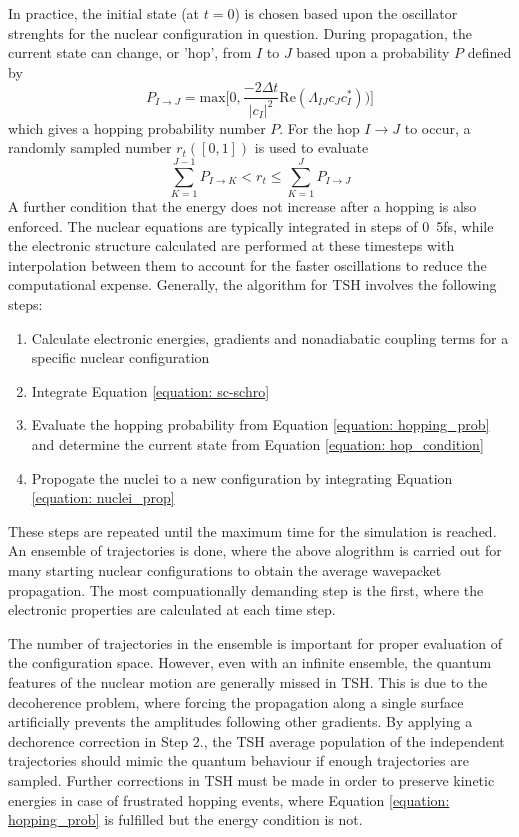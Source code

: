 In practice, the initial state (at $t=0$) is chosen based upon the oscillator strenghts for the nuclear configuration in question. During propagation, the current state can change, or 'hop', from $I$ to $J$ based upon a probability $P$ defined by
\begin{equation}\label{equation: hopping_prob}
    P_{I\rightarrow{}J}=\mathrm{max}\bigg[0,\frac{-2\Delta{}t}{|c_{I}|^{2}}\mathrm{Re}(\Lambda_{IJ}c_{J}c_{I}^{\ast}))\bigg]
\end{equation}
which gives a hopping probability number $P$. For the hop $I\rightarrow{}J$ to occur, a randomly sampled number $r_{t}([0,1])$ is used to evaluate
\begin{equation}\label{equation: hop_condition}
    \sum_{K=1}^{J-1}P_{I\rightarrow{}K}<r_{t}\leq{}\sum_{K=1}^{J}P_{I\rightarrow{}J}
\end{equation}
A further condition that the energy does not increase after a hopping is also enforced. The nuclear equations are typically integrated in steps of \si{0.5}{fs}, while the electronic structure calculated are performed at these timesteps with interpolation between them to account for the faster oscillations to reduce the computational expense. Generally, the algorithm for \ac{TSH} involves the following steps:
\begin{enumerate}
    \item Calculate electronic energies, gradients and nonadiabatic coupling terms for a specific nuclear configuration
    \item Integrate Equation \ref{equation: sc-schro}
    \item Evaluate the hopping probability from Equation \ref{equation: hopping_prob} and determine the current state from Equation \ref{equation: hop_condition}
    \item Propogate the nuclei to a new configuration by integrating Equation \ref{equation: nuclei_prop}
\end{enumerate}
These steps are repeated until the maximum time for the simulation is reached. An ensemble of trajectories is done, where the above alogrithm is carried out for many starting nuclear configurations to obtain the average wavepacket propagation. The most compuationally demanding step is the first, where the electronic properties are calculated at each time step. 

The number of trajectories in the ensemble is important for proper evaluation of the configuration space. However, even with an infinite ensemble, the quantum features of the nuclear motion are generally missed in \ac{TSH}. This is due to the decoherence problem, where forcing the propagation along a single surface artificially prevents the amplitudes following other gradients. By applying a dechorence correction in Step 2., the \ac{TSH} average population of the independent trajectories should mimic the quantum behaviour if enough trajectories are sampled.\cite{Granucci2007} Further corrections in \ac{TSH} must be made in order to preserve kinetic energies in case of frustrated hopping events, where Equation \ref{equation: hopping_prob} is fulfilled but the energy condition is not.

